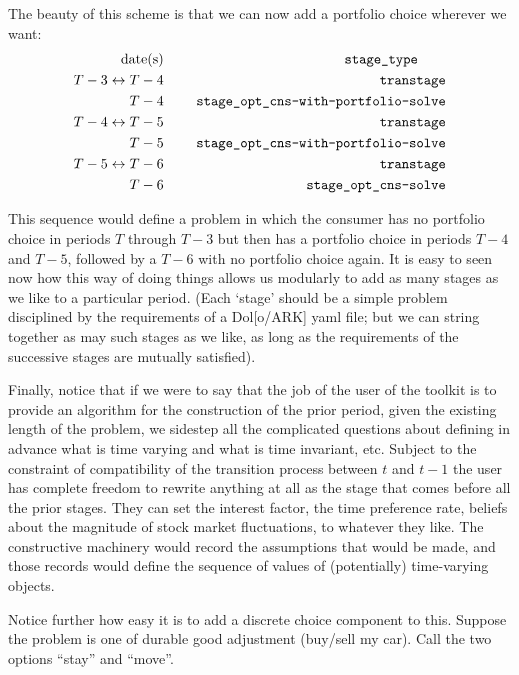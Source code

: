 \documentclass[\econtexRoot/BufferStockTheory]{subfiles}
\begin{document}
The beauty of this scheme is that we can now add a portfolio choice wherever we want:
\begin{alignat}{3}
\text{date(s)}            &      &   \notag      \qquad \texttt{stage\_type} \qquad
\\ T-3\leftrightarrow T-4 & ~~~~ & \text{\texttt{transtage}}
\\ T-4                    & ~~~~ & \text{\texttt{stage\_opt\_cns-with-portfolio-solve}}
\\ T-4\leftrightarrow T-5 & ~~~~ & \text{\texttt{transtage}}
\\ T-5                    & ~~~~ & \text{\texttt{stage\_opt\_cns-with-portfolio-solve}}
\\ T-5\leftrightarrow T-6 & ~~~~ & \text{\texttt{transtage}}
\\ T-6                    & ~~~~ & \text{\texttt{stage\_opt\_cns-solve}}
\end{alignat}

This sequence would define a problem in which the consumer has no portfolio choice in periods $T$ through $T-3$ but then has a portfolio choice in periods $T-4$ and $T-5$, followed by a $T-6$ with no portfolio choice again.
It is easy to seen now how this way of doing things allows us modularly to add as many stages as we like to a particular period.
(Each `stage' should be a simple problem disciplined by the requirements of a Dol[o/ARK] yaml file; but we can string together as may such stages as we like, as long as the requirements of the successive stages are mutually satisfied).

Finally, notice that if we were to say that the job of the user of the toolkit is to provide an algorithm for the construction of the prior period, given the existing length of the problem, we sidestep all the complicated questions about defining in advance what is time varying and what is time invariant, etc.
Subject to the constraint of compatibility of the transition process between $t$ and $t-1$ the user has complete freedom to rewrite anything at all as the stage that comes before all the prior stages.
They can set the interest factor, the time preference rate, beliefs about the magnitude of stock market fluctuations, to whatever they like.
The constructive machinery would record the assumptions that would be made, and those records would define the sequence of values of (potentially) time-varying objects.

Notice further how easy it is to add a discrete choice component to this.
Suppose the problem is one of durable good adjustment (buy/sell my car).
Call the two options ``stay'' and ``move''.
\end{document}
